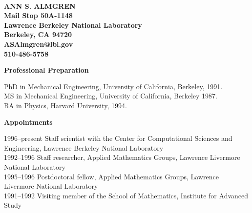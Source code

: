 \documentclass[11pt,letterpaper,english]{article}
\begin{document}
\setlength{\parindent}{0in} %

\pagestyle{fancy}   \renewcommand{%
\headrulewidth}{0.0pt}



\\
{\bf ANN S. ALMGREN}\\
{\bf Mail Stop 50A-1148 \\
Lawrence Berkeley National Laboratory \\
Berkeley, CA 94720 \\
ASAlmgren@lbl.gov \\
510-486-5758} \smallskip

\begin{flushleft} {\bf Professional Preparation}
{\parindent 16pt

PhD in Mechanical Engineering, University of California, Berkeley, 1991. \\
MS in Mechanical Engineering, University of California, Berkeley 1987.\\ 
BA in Physics, Harvard University, 1994.\\ 

}

\vspace{.04in}
{\bf Appointments}
{\parindent 16pt

1996--present Staff scientist with the Center for Computational Sciences and Engineering, Lawrence Berkeley National Laboratory \\ 
1992--1996 Staff researcher, Applied Mathematics Groups, Lawrence Livermore National Laboratory \\ 
1995--1996 Postdoctoral fellow, Applied Mathematics Groups, Lawrence Livermore National Laboratory \\ 
1991--1992 Visiting member of the School of Mathematics, Institute for Advanced Study \\

}


\end{flushleft}
\end{document}
